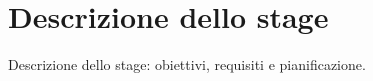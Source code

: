
\chapter{Descrizione dello stage}
\label{cap:descrizionestage}

Descrizione dello stage: obiettivi, requisiti e pianificazione.